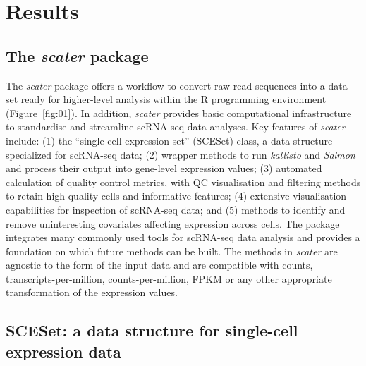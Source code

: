 \documentclass{bioinfo}
\begin{document}
\section{Results}\label{results}

\subsection{The \emph{scater} package}\label{the-scater-package}

The \emph{scater} package offers a workflow to convert raw read sequences into a data set ready for higher-level analysis within the R programming environment (Figure~\ref{fig:01}). In addition, \emph{scater} provides basic computational infrastructure to standardise and streamline scRNA-seq data analyses. Key features of \emph{scater} include: (1) the ``single-cell expression set'' (SCESet) class, a data structure specialized for scRNA-seq data; (2) wrapper methods to run \emph{kallisto} and \emph{Salmon} and process their output into gene-level expression values; (3) automated calculation of quality control metrics, with QC visualisation and filtering methods to retain high-quality cells and informative features; (4) extensive visualisation capabilities for inspection of scRNA-seq data; and (5) methods to identify and remove uninteresting covariates affecting expression across cells. The package integrates many commonly used tools for scRNA-seq data analysis and provides a foundation on which future methods can be built. The methods in \emph{scater} are agnostic to the form of the input data and are compatible with counts, transcripts-per-million, counts-per-million, FPKM or any other appropriate transformation of the expression values.


\subsection{SCESet: a data structure for single-cell expression
data}\label{sceset-a-data-structure-for-single-cell-expression-data}
\end{document}
